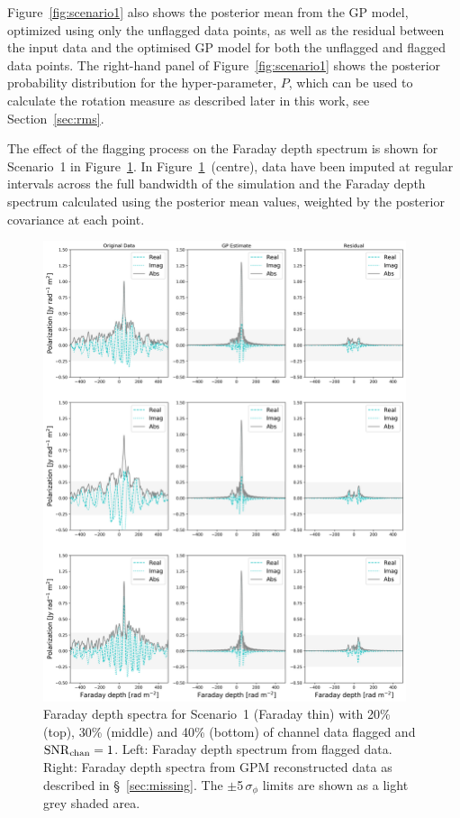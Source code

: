 \documentclass[fleqn,usenatbib]{mnras}
\begin{document}
Figure~\ref{fig:scenario1} also shows the posterior mean  from the GP model, optimized using only the unflagged data points, as well as the residual between the input data and the optimised GP model for both the unflagged and flagged data points. The right-hand panel of Figure~\ref{fig:scenario1} shows the posterior probability distribution for the hyper-parameter, $P$, which can be used to calculate the rotation measure as described later in this work, see Section~\ref{sec:rms}.

The effect of the flagging process on the Faraday depth spectrum is shown for Scenario~1 in Figure~\ref{fig:flagging1}. In Figure~\ref{fig:flagging1}~(centre), data have been imputed at regular intervals across the full bandwidth of the simulation and the Faraday depth spectrum calculated using the posterior mean values, weighted by the posterior covariance at each point. 
%
\begin{figure}
\centerline{\includegraphics[width=0.95\textwidth]{./FIGURES/figure5.png}}
\caption{\label{fig:flagging1} Faraday depth spectra for Scenario~1 (Faraday thin) with 20\% (top), 30\% (middle) and 40\% (bottom) of channel data flagged and ${\rm SNR}_{\rm chan} = 1$. Left: Faraday depth spectrum from flagged data. Right: Faraday depth spectra from GPM reconstructed data as described in \S~\ref{sec:missing}. The $\pm$5\,$\sigma_{\phi}$ limits are shown as a light grey shaded area.}
\end{figure}
\end{document}
